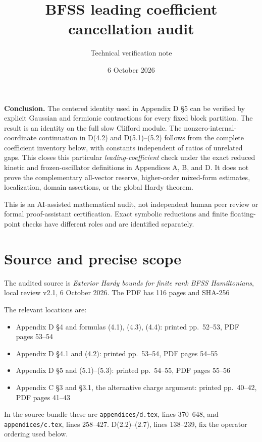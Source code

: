 \documentclass[11pt,letterpaper]{article}
\title{BFSS leading coefficient cancellation audit}
\author{Technical verification note}
\date{6 October 2026}
\begin{document}
\maketitle
\textbf{Conclusion.} The centered identity used in Appendix D \S5 can be verified by explicit Gaussian and fermionic contractions for every fixed block partition. The result is an identity on the full slow Clifford module. The nonzero-internal-coordinate continuation in D(4.2) and D(5.1)--(5.2) follows from the complete coefficient inventory below, with constants independent of ratios of unrelated gaps. This closes this particular \emph{leading-coefficient} check under the exact reduced kinetic and frozen-oscillator definitions in Appendices A, B, and D. It does not prove the complementary all-vector reserve, higher-order mixed-form estimates, localization, domain assertions, or the global Hardy theorem.

This is an AI-assisted mathematical audit, not independent human peer review or formal proof-assistant certification. Exact symbolic reductions and finite floating-point checks have different roles and are identified separately.

\section{Source and precise scope}
The audited source is \emph{Exterior Hardy bounds for finite rank BFSS Hamiltonians}, local review v2.1, 6 October 2026. The PDF has 116 pages and SHA-256
\begin{quote}\small\ttfamily
{}
\end{quote}
The relevant locations are:
\begin{itemize}
\item Appendix D \S4 and formulas (4.1), (4.3), (4.4): printed pp.~52--53, PDF pages 53--54
\item Appendix D \S4.1 and (4.2): printed pp.~53--54, PDF pages 54--55
\item Appendix D \S5 and (5.1)--(5.3): printed pp.~54--55, PDF pages 55--56
\item Appendix C \S3 and \S3.1, the alternative charge argument: printed pp.~40--42, PDF pages 41--43
\end{itemize}
In the source bundle these are \texttt{appendices/d.tex}, lines 370--648, and \texttt{appendices/c.tex}, lines 258--427. D(2.2)--(2.7), lines 138--239, fix the operator ordering used below.
\end{document}
